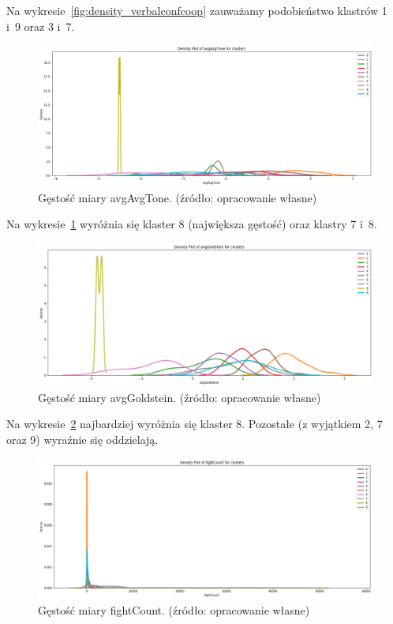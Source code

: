 \documentclass[11pt]{report}
\begin{document}
    Na wykresie~\ref{fig:density_verbalconfcoop} zauważamy podobieństwo klastrów 1 i~9 oraz 3 i~7.

    \begin{figure}[!htp]
        \centering
        \includegraphics[width=\linewidth]{fig/CLUST/density_avgAvgTone.png}
        \caption{Gęstość miary avgAvgTone. (źródło: opracowanie własne)}
        \label{fig:density_avgavgtone}
    \end{figure}

    Na wykresie~\ref{fig:density_avgavgtone} wyróżnia się klaster 8 (największa gęstość) oraz klastry 7 i~8.


    \begin{figure}[!htp]
        \centering
        \includegraphics[width=\linewidth]{fig/CLUST/density_avgGoldstein.png}
        \caption{Gęstość miary avgGoldstein. (źródło: opracowanie własne)}
        \label{fig:density_avggoldstein}
    \end{figure}

    Na wykresie~\ref{fig:density_avggoldstein} najbardziej wyróżnia się klaster 8.
    Pozostałe (z wyjątkiem 2, 7 oraz 9) wyraźnie się oddzielają.

    \begin{figure}[!htp]
        \centering
        \includegraphics[width=\linewidth]{fig/CLUST/density_fightCount.png}
        \caption{Gęstość miary fightCount. (źródło: opracowanie własne)}
        \label{fig:density_fightcount}
    \end{figure}
\end{document}
